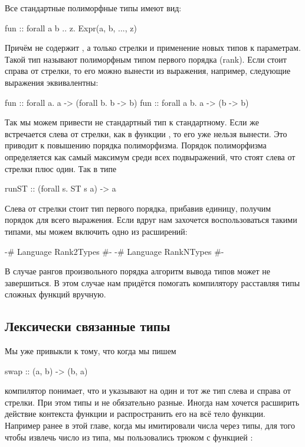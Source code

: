 Все стандартные полиморфные типы имеют вид:


\begin{code}
fun :: forall a b .. z. Expr(a, b, ..., z)
\end{code}

Причём  не содержит , а только стрелки и применение
новых типов к параметрам. Такой тип называют полиморфным типом первого
порядка (rank). Если  стоит справа от стрелки, то его можно
вынести из выражения, например, следующие выражения эквивалентны:


\begin{code}
fun :: forall a.   a -> (forall b. b -> b)
fun :: forall a b. a -> (b -> b)
\end{code}

Так мы можем привести не стандартный тип к стандартному. Если же
 встречается слева от стрелки, как в функции , то
его уже нельзя вынести. Это приводит к повышению порядка полиморфизма.
Порядок полиморфизма определяется как самый максимум среди всех
подвыражений, что стоят слева от стрелки плюс один. Так в типе


\begin{code}
runST :: (forall s. ST s a) -> a
\end{code}

Слева от стрелки стоит тип первого порядка, прибавив единицу, получим
порядок для всего выражения. Если вдруг нам захочется воспользоваться
такими типами, мы можем включить одно из расширений:


\begin{code}
{-# Language Rank2Types #-}
{-# Language RankNTypes #-}
\end{code}

В случае рангов произвольного порядка алгоритм вывода типов может не
завершиться. В этом случае нам придётся помогать компилятору расставляя
типы сложных функций вручную.

\subsection{Лексически связанные типы}

Мы уже привыкли к тому, что когда мы пишем


\begin{code}
swap :: (a, b) -> (b, a)
\end{code}

\noindent 

компилятор понимает, что  и  указывают на один и тот же тип
слева и справа от стрелки. При этом типы  и  не обязательно
разные. Иногда нам хочется расширить действие контекста функции и
распространить его на всё тело функции. Например ранее в этой главе,
когда мы имитировали числа через типы, для того чтобы извлечь число из
типа, мы пользовались трюком с функцией :


